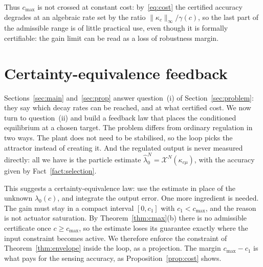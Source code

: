 \documentclass[letterpaper, 10pt, conference]{ieeeconf}
\newcommand{\rev}[1]{#1}
\newcommand{\pl}[1]{#1}
\begin{document}
Thus $c_{\max}$ is not crossed at constant cost: \rev{by~\eqref{eq:cost} the
certified accuracy degrades at an algebraic rate set by the ratio
$\|\kappa_c\|_\infty/\gamma(c)$}, \pl{so the last part of the admissible range
is of little practical use, even though it is formally certifiable: the gain
limit can be read as a loss of robustness margin.}




\section{Certainty-equivalence feedback}
\label{sec:feedback}
\rev{Sections~\ref{sec:main} and~\ref{sec:prop} answer question~(i) of
Section~\ref{sec:problem}: they say which decay rates can be reached, and at
what certified cost. We now turn to question~(ii) and build a feedback law that
places the conditioned equilibrium at a chosen target. The problem differs from
ordinary regulation in two ways. The plant does not need to be stabilised, so
the loop \pl{picks} the attractor instead of creating it. And the regulated output
is never measured directly: all we have is the particle estimate
$\widehat\lambda_0^N=\mathcal X^N(\kappa_{c\mu})$, with the accuracy given by
Fact~\ref{fact:selection}.}

\rev{This suggests a certainty-equivalence law: use the estimate in place of
the unknown $\lambda_0(c)$, and integrate the output error. One more ingredient
is needed. The gain must stay in a compact interval $[0,c_1]$ with
$c_1<c_{\max}$, and the reason is not actuator saturation. By
Theorem~\ref{thm:cmax}(b) there is no admissible certificate once
$c\ge c_{\max}$, so the estimate loses its guarantee exactly where the input
constraint becomes active. We therefore enforce the constraint of
Theorem~\ref{thm:envelope} inside the loop, as a projection. The margin
$c_{\max}-c_1$ is what pays for the sensing accuracy, as
Proposition~\ref{prop:cost} shows.}

\end{document}
